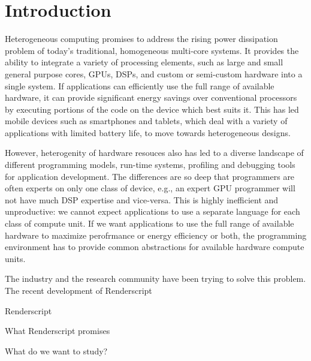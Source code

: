 \section{Introduction}

Heterogeneous computing promises to address the rising power dissipation problem
of today's traditional, homogeneous multi-core
systems. It provides the ability to integrate a variety of processing elements,
such as large and small general purpose cores, GPUs, DSPs, and custom or
semi-custom hardware into a single system. If applications can efficiently use
the full range of available hardware, it can provide significant energy
savings over conventional processors by executing portions of the code on the
device which best suits it. This has led mobile devices such as smartphones
and tablets, which deal with a variety of applications with limited battery
life, to move towards heterogeneous designs.

However, heterogenity of hardware resouces also has led to a diverse landscape
of different programming models, run-time systems, profiling and debugging tools
for application development. The differences are so deep that programmers are
often experts on only one class of device, e.g., an expert GPU programmer will
not have much DSP expertise and vice-versa. This is highly inefficient and
unproductive: we cannot expect applications to use a separate language for each
class of compute unit. If we want applications to use the full range of
available hardware to maximize perofrmance or energy efficiency or both, the
programming environment has to provide common abstractions for available
hardware compute units.



The industry and the research community have been trying to solve this problem.
The recent development of Renderscript~\cite{Renderscript}  

Renderscript

What Renderscript promises

What do we want to study?


